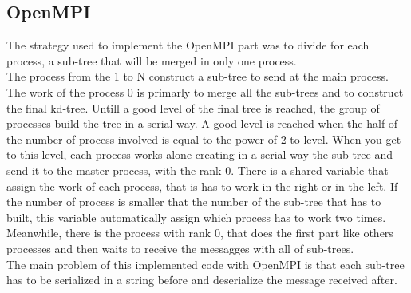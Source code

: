 \documentclass[11pt,a4paper]{article}
\begin{document}
\subsection{OpenMPI}
The strategy used to implement the OpenMPI part was to divide for each process, a sub-tree that will be merged in only one process.\\
The process from the 1 to N construct a sub-tree to send at the main process. The work of the process 0 is primarly to merge all the sub-trees and to construct the final kd-tree. Untill a good level of the final tree is reached, the group of processes build the tree in a serial way. A good level is reached when the half of the number of process involved is equal to the power of 2 to level. When you get to this level, each process works alone creating in a serial way the sub-tree and send it to the master process, with the rank 0. There is a shared variable that assign the work of each process, that is has to work in the right or in the left. If the number of process is smaller that the number of the sub-tree that has to built, this variable automatically assign which process has to work two times. Meanwhile, there is the process with rank 0, that does the first part like others processes and then waits to receive the messagges with all of sub-trees.\\
The main problem of this implemented code with OpenMPI is that each sub-tree has to be serialized in a string before and deserialize the message received after.
\end{document}

